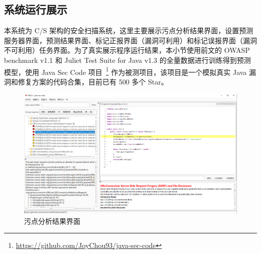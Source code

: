 %
%
%

\subsection{系统运行展示}

本系统为 C/S 架构的安全扫描系统，这里主要展示污点分析结果界面，设置预测服务器界面，预测结果界面、标记正报界面（漏洞可利用）和标记误报界面（漏洞不可利用）任务界面。为了真实展示程序运行结果，本小节使用前文的 OWASP benchmark v1.1 和 Juliet Test Suite for Java v1.3 的全量数据进行训练得到预测模型，使用 Java Sec Code 项目~\footnote{\url{https://github.com/JoyChou93/java-sec-code}} 作为被测项目，该项目是一个模拟真实 Java 漏洞和修复方案的代码合集，目前已有 500 多个 Star。

\begin{figure}[H]
    \centering
    \includegraphics[width=0.8\linewidth]{FIGs/chapter4/taintAnalysis.png}
    \caption{污点分析结果界面}\label{show:taint}
\end{figure} 

